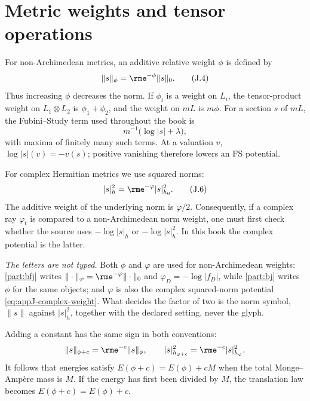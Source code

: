 \section{Metric weights and tensor operations}
\label{sec:appJ-metrics}

For non-Archimedean metrics, an additive relative weight \(\phi\) is defined
by
\begin{equation*}
 \|s\|_{\phi}=\rme^{-\phi}\|s\|_0.
 \tag{J.4}\label{eq:appJ-na-weight}
\end{equation*}
Thus increasing \(\phi\) decreases the norm.  If \(\phi_i\) is a weight on
\(L_i\), the tensor-product weight on \(L_1\otimes L_2\) is
\(\phi_1+\phi_2\), and the weight on \(mL\) is \(m\phi\).  For a section
\(s\) of \(mL\), the Fubini--Study term used throughout the book is
\begin{equation*}
 m^{-1}\bigl(\log|s|+\lambda\bigr),
 \tag{J.5}\label{eq:appJ-fs-term}
\end{equation*}
with maxima of finitely many such terms.  At a valuation \(v\),
\(\log|s|(v)=-v(s)\); positive vanishing therefore lowers an FS potential.

For complex Hermitian metrics we use squared norms:
\begin{equation*}
 |s|_h^2=\rme^{-\varphi}|s|_{h_0}^2.
 \tag{J.6}\label{eq:appJ-complex-weight}
\end{equation*}
The additive weight of the underlying norm is \(\varphi/2\).  Consequently,
if a complex ray \(\varphi_t\) is compared to a non-Archimedean norm weight,
one must first check whether the source uses \(-\log|s|_h\) or
\(-\log|s|_h^2\).  In this book the complex potential is the latter.

\emph{The letters are not typed.}  Both \(\phi\) and \(\varphi\) are used
for non-Archimedean weights: \cref{part:bfj} writes
\(\|\cdot\|_\varphi=\rme^{-\varphi}\|\cdot\|_0\) and
\(\varphi_D=-\log|f_D|\), while \cref{part:bj} writes \(\phi\) for the same
objects; and \(\varphi\) is also the complex squared-norm potential
\eqref{eq:appJ-complex-weight}.  What decides the factor of two is the norm
symbol, \(\|s\|\) against \(|s|_h^2\), together with the declared setting,
never the glyph.

Adding a constant has the same sign in both conventions:
\[
 \|s\|_{\phi+c}=\rme^{-c}\|s\|_\phi,
 \qquad
 |s|_{h_{\varphi+c}}^2=\rme^{-c}|s|_{h_\varphi}^2.
\]
It follows that energies satisfy \(E(\phi+c)=E(\phi)+cM\) when the total
Monge--Amp\`ere mass is \(M\).  If the energy has first been divided by
\(M\), the translation law becomes \(E(\phi+c)=E(\phi)+c\).

